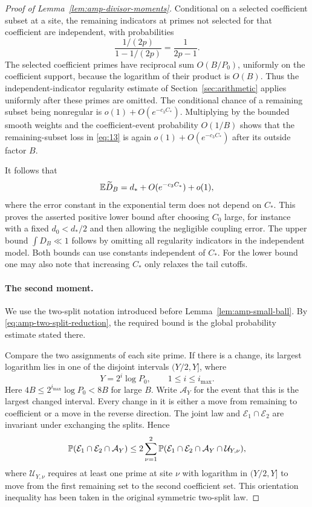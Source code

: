 \begin{proof}[Proof of Lemma~\ref{lem:amp-divisor-moments}]
Conditional on a selected coefficient subset at a site, the
remaining indicators at primes not selected for that coefficient
are independent, with probabilities
\[
 \frac{1/(2p)}{1-1/(2p)}=\frac1{2p-1}.
\]
The selected coefficient primes have reciprocal sum $O(B/P_0)$,
uniformly on the coefficient support, because the logarithm of
their product is $O(B)$.  Thus the independent-indicator regularity
estimate of Section~\ref{sec:arithmetic} applies uniformly after
these primes are omitted.  The conditional chance of a remaining
subset being nonregular is
$o(1)+O(e^{-c_3C_*})$.  Multiplying by the bounded smooth weights
and the coefficient-event probability $O(1/B)$ shows that the
remaining-subset loss in \eqref{eq:13} is again
$o(1)+O(e^{-c_3C_*})$ after its outside factor $B$.

It follows that
\[
 \mathbb E\widetilde D_B=d_*+O(e^{-c_3C_*})+o(1),
\]
where the error constant in the exponential term does not depend
on $C_*$.  This proves the asserted positive lower bound after
choosing $C_0$ large, for instance with a fixed $d_0<d_*/2$ and
then allowing the negligible coupling error.  The upper bound
$\int D_B\ll1$ follows by omitting all regularity indicators in
the independent model.  Both bounds can use constants independent
of $C_*$.  For the lower bound one may also note that increasing
$C_*$ only relaxes the tail cutoffs.

\paragraph{The second moment.}
We use the two-split notation introduced before
Lemma~\ref{lem:amp-small-ball}. By \eqref{eq:amp-two-split-reduction},
the required bound is the global probability estimate stated there.

Compare the two assignments of each site prime.  If there is a
change, its largest logarithm lies in one of the disjoint
intervals $(Y/2,Y]$, where
\[
 Y=2^i\log P_0,\qquad 1\le i\le i_{\max}.
\]
Here $4B\le2^{i_{\max}}\log P_0<8B$ for large $B$.
Write $\mathcal A_Y$ for the event that this is the largest changed
interval.  Every change in it is either a move from remaining to
coefficient or a move in the reverse direction.  The joint law
and $\mathcal E_1\cap\mathcal E_2$ are invariant under exchanging
the splits.  Hence
\[
 \mathbb P(\mathcal E_1\cap\mathcal E_2\cap\mathcal A_Y)
 \le 2\sum_{\nu=1}^2
 \mathbb P(\mathcal E_1\cap\mathcal E_2\cap\mathcal A_Y
       \cap\mathcal U_{Y,\nu}),
\]
where $\mathcal U_{Y,\nu}$ requires at least one prime at site
$\nu$ with logarithm in $(Y/2,Y]$ to move from the first remaining
set to the second coefficient set.  This orientation inequality
has been taken in the original symmetric two-split law.


\end{proof}
